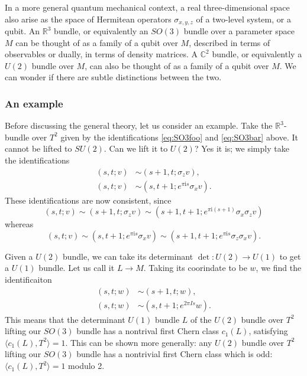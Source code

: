 \documentclass[12pt]{article}
\numberwithin{equation}{section}
\numberwithin{figure}{section}
\theoremstyle{remark}
\def\bC{\mathbb{C}}
\def\bR{\mathbb{R}}
\def\I{\mathrm{i}}
\begin{document}
In a more general quantum mechanical context, a real three-dimensional space
also arise as the space of Hermitean operators $\sigma_{x,y,z}$
of a two-level system, or a qubit.
An $\bR^3$ bundle, or equivalently an $SO(3)$ bundle over a parameter space $M$
can be thought of as a family of a qubit over $M$,
described in terms of observables or dually, in terms of density matrices. 
A $\bC^2$ bundle, or equivalently a $U(2)$ bundle over $M$, 
can also be thought of as a family of a qubit over $M$.
We can wonder if there are subtle distinctions between the two.

\subsubsection{An example}

Before discussing the general theory, let us consider an example.
Take the $\bR^3$-bundle over $T^2$ given by the identifications \eqref{eq:SO3foo} and \eqref{eq:SO3bar} above.
It cannot be lifted to $SU(2)$. Can we lift it to $U(2)$?
Yes it is; we simply take the identifications \begin{align}
  (s,t;v) &\sim (s+1,t;\sigma_z v),\\
  (s,t;v) &\sim (s,t+1;e^{\pi \I s}\sigma_x v).
\end{align}
These identifications are now consistent, since \begin{equation}
  (s,t;v)\sim (s+1,t;\sigma_z v)\sim (s+1,t+1;e^{\pi \I (s+1)}\sigma_x\sigma_z v)
\end{equation} whereas \begin{equation}
  (s,t;v)\sim (s,t+1;e^{\pi \I s}\sigma_x v)\sim (s+1,t+1;e^{\pi \I s}\sigma_z\sigma_x v).
\end{equation}

Given a $U(2)$ bundle, we can take its determinant $\det:U(2)\to U(1)$ to get a $U(1)$ bundle. 
Let us call it $L\to M$.
Taking its coorindate to be $w$, we find the identificaiton \begin{align}
  (s,t;w) &\sim (s+1,t;w),\\
  (s,t;w) &\sim (s,t+1;e^{2\pi I s}w).
\end{align}
This means that the determinant $U(1)$ bundle $L$ of the $U(2)$ bundle over $T^2$
lifting our $SO(3)$ bundle has a nontrival first Chern class $c_1(L)$,
satisfying $\langle c_1(L),T^2\rangle=1$.
This can be shown more generally:
any $U(2)$ bundle over $T^2$ lifting our $SO(3)$ bundle 
has a nontrivial first Chern class which is odd: $\langle c_1(L),T^2\rangle=1$ modulo 2.
\end{document}
